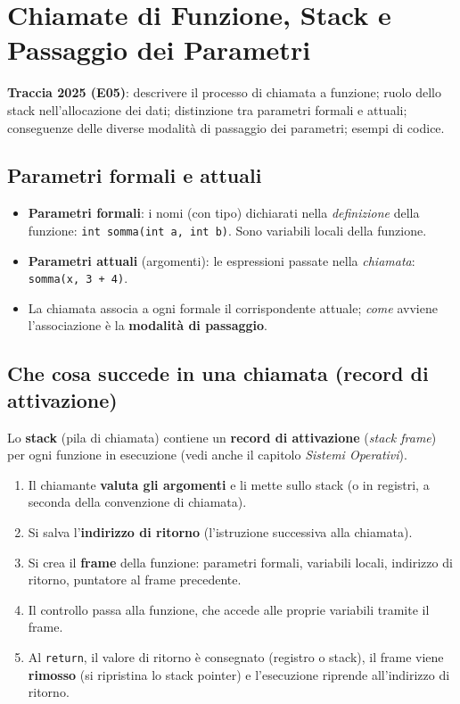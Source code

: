 \section{Chiamate di Funzione, Stack e Passaggio dei Parametri}
\textbf{Traccia 2025 (E05)}: descrivere il processo di chiamata a funzione; ruolo dello stack nell'allocazione dei dati; distinzione tra parametri formali e attuali; conseguenze delle diverse modalità di passaggio dei parametri; esempi di codice.

\subsection{Parametri formali e attuali}
\begin{itemize}
    \item \textbf{Parametri formali}: i nomi (con tipo) dichiarati nella \emph{definizione} della funzione: \texttt{int somma(int a, int b)}. Sono variabili locali della funzione.
    \item \textbf{Parametri attuali} (argomenti): le espressioni passate nella \emph{chiamata}: \texttt{somma(x, 3 + 4)}.
    \item La chiamata associa a ogni formale il corrispondente attuale; \emph{come} avviene l'associazione è la \textbf{modalità di passaggio}.
\end{itemize}

\subsection{Che cosa succede in una chiamata (record di attivazione)}
Lo \textbf{stack} (pila di chiamata) contiene un \textbf{record di attivazione} (\emph{stack frame}) per ogni funzione in esecuzione (vedi anche il capitolo \emph{Sistemi Operativi}).
\begin{enumerate}
    \item Il chiamante \textbf{valuta gli argomenti} e li mette sullo stack (o in registri, a seconda della convenzione di chiamata).
    \item Si salva l'\textbf{indirizzo di ritorno} (l'istruzione successiva alla chiamata).
    \item Si crea il \textbf{frame} della funzione: parametri formali, variabili locali, indirizzo di ritorno, puntatore al frame precedente.
    \item Il controllo passa alla funzione, che accede alle proprie variabili tramite il frame.
    \item Al \texttt{return}, il valore di ritorno è consegnato (registro o stack), il frame viene \textbf{rimosso} (si ripristina lo stack pointer) e l'esecuzione riprende all'indirizzo di ritorno.
\end{enumerate}

